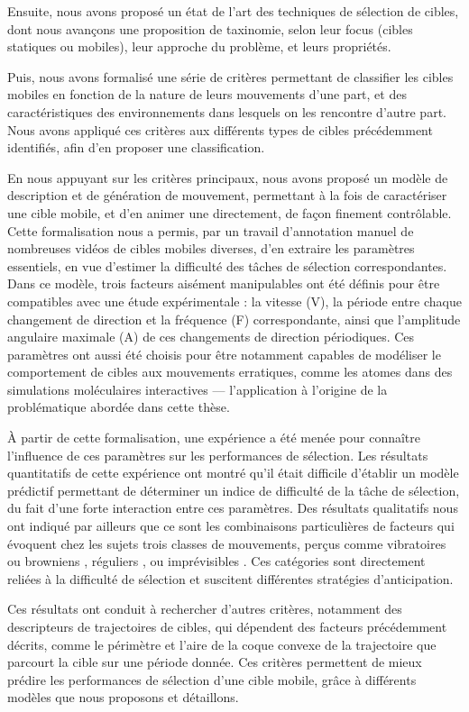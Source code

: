 	Ensuite, nous avons proposé un état de l'art des techniques de sélection de cibles, dont nous avançons une proposition de taxinomie, selon leur focus (cibles statiques ou mobiles), leur approche du problème, et leurs propriétés.
	
	Puis, nous avons formalisé une série de critères permettant de classifier les cibles mobiles en fonction de la nature de leurs mouvements d'une part, et des caractéristiques des environnements dans lesquels on les rencontre d'autre part. Nous avons appliqué ces critères aux différents types de cibles précédemment identifiés, afin d'en proposer une classification.
	
	En nous appuyant sur les critères principaux, nous avons proposé un modèle de description et de génération de mouvement, permettant à la fois de caractériser une cible mobile, et d'en animer une directement, de façon finement contrôlable. Cette formalisation nous a permis, par un travail d'annotation manuel de nombreuses vidéos de cibles mobiles diverses, d'en extraire les paramètres essentiels, en vue d'estimer la difficulté des tâches de sélection correspondantes. Dans ce modèle, trois facteurs aisément manipulables ont été définis pour être compatibles avec une étude expérimentale : la vitesse (V), la période entre chaque changement de direction et la fréquence (F) correspondante, ainsi que l'amplitude angulaire maximale (A) de ces changements de direction périodiques. Ces paramètres ont aussi été choisis pour être notamment capables de modéliser le comportement de cibles aux mouvements erratiques, comme les atomes dans des simulations moléculaires interactives --- l’application à l’origine de la problématique abordée dans cette thèse.

	À partir de cette formalisation, une expérience a été menée pour connaître l'influence de ces paramètres sur les performances de sélection. Les résultats quantitatifs de cette expérience ont montré qu'il était difficile d'établir un modèle prédictif permettant de déterminer un indice de difficulté de la tâche de sélection, du fait d'une forte interaction entre ces paramètres. Des résultats qualitatifs nous ont indiqué par ailleurs que ce sont les combinaisons particulières de facteurs qui évoquent chez les sujets trois classes de mouvements, perçus comme \og vibratoires \fg{} ou \og browniens \fg{}, \og réguliers \fg{}, ou \og imprévisibles \fg{}. Ces catégories sont directement reliées à la difficulté de sélection et suscitent différentes stratégies d'anticipation.

	Ces résultats ont conduit à rechercher d'autres critères, notamment des descripteurs de trajectoires de cibles, qui dépendent des facteurs précédemment décrits, comme le périmètre et l'aire de la coque convexe de la trajectoire que parcourt la cible sur une période donnée. Ces critères permettent de mieux prédire les performances de sélection d'une cible mobile, grâce à différents modèles que nous proposons et détaillons.

